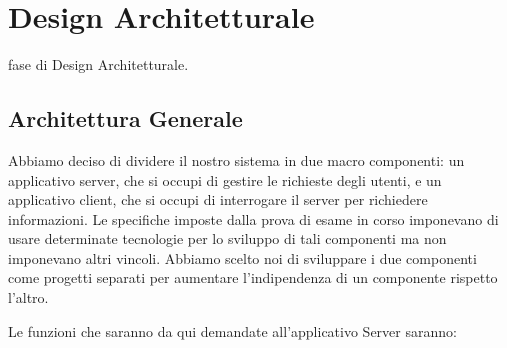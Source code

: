

\chapter{Design Architetturale}
     fase di Design Architetturale.
    \section{Architettura Generale}
    
    Abbiamo deciso di dividere il nostro sistema in due macro componenti: un applicativo server, che si occupi di gestire le richieste degli utenti, e un applicativo client, che si occupi di interrogare il server per richiedere informazioni. Le specifiche imposte dalla prova di esame in corso imponevano di usare determinate tecnologie per lo sviluppo di tali componenti ma non imponevano altri vincoli. Abbiamo scelto noi di sviluppare i due componenti come progetti separati per aumentare l'indipendenza di un componente rispetto l'altro.
    
    \par Le funzioni che saranno da qui demandate all'applicativo Server saranno:
    
